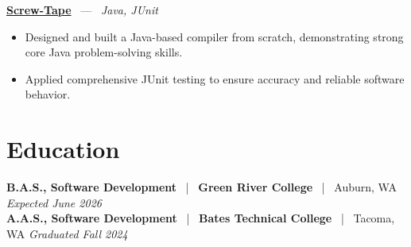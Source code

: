 \documentclass[10pt, letterpaper]{article}
\newcommand{\jobhead}[4]{%
  \vspace{5pt}%
  {\bfseries\color{dark}#1}%
  ~{\color{light}|}~%
  {\bfseries\color{navy}#2}%
  ~{\color{light}|}~%
  {\color{light}#3}%
  \hfill{\color{light}\small\textit{#4}}\\[-2pt]%
}
\newcommand{\projhead}[3]{%
  \vspace{5pt}%
  {\bfseries\color{dark}\href{#2}{#1}}%
  ~{\color{light}---}~%
  {\color{light}\small\textit{#3}}\\[-2pt]%
}
\begin{document}
\projhead{Screw-Tape}{https://github.com/timmyd4/screwtape}{Java, JUnit}
\begin{itemize}
  \item Designed and built a Java-based compiler from scratch, demonstrating strong core Java problem-solving skills.
  \item Applied comprehensive JUnit testing to ensure accuracy and reliable software behavior.
\end{itemize}

\section{Education}

\jobhead{B.A.S., Software Development}{Green River College}{Auburn, WA}{Expected June 2026}
\jobhead{A.A.S., Software Development}{Bates Technical College}{Tacoma, WA}{Graduated Fall 2024}
\end{document}
